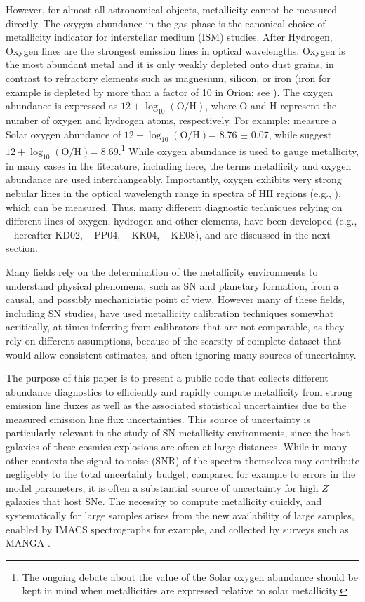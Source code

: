 \documentclass{emulateapj}
\newcommand{\oxabinline}{\ensuremath{12 + \log_{10}(\mathrm{O}/\mathrm{H})}}
\begin{document}
However, for almost all astronomical objects, metallicity cannot be
measured directly. The oxygen abundance in the gas-phase is the
canonical choice of metallicity indicator for interstellar medium
(ISM) studies. After Hydrogen, Oxygen lines are the strongest emission
lines in optical wavelengths. Oxygen is the most abundant metal and it
is only weakly depleted onto dust grains, in contrast to refractory
elements such as magnesium, silicon, or iron (iron for example is
depleted by more than a factor of 10 in Orion; see
\citealt{simondiaz11-orion}). The oxygen abundance is expressed as
\oxabinline, where O and H represent the number of oxygen and hydrogen
atoms, respectively. For example: \citealt{chaffau11} measure a Solar
oxygen abundance of \oxabinline = 8.76 $\pm$ 0.07, while
\citet{asplund09rev} suggest \oxabinline = 8.69.\footnote{The ongoing
  debate about the value of the Solar oxygen abundance should be kept
  in mind when metallicities are expressed relative to solar
  metallicity.}  While oxygen abundance is used to gauge metallicity,
in many cases in the literature, including here, the terms metallicity
and oxygen abundance are used interchangeably.  Importantly, oxygen
exhibits very strong nebular lines in the optical wavelength range in
spectra of HII regions (e.g.,
\citealt{pagel79,osterbrock89,tremonti04}), which can be
measured. Thus, many different diagnostic techniques relying on
different lines of oxygen, hydrogen and other elements, have been
developed (e.g., \citealt{kewley02} -- hereafter KD02,
\citealt{pettini04} -- PP04, \citealt{kobulnicky04} -- KK04,
\citealt{kewley08} -- KE08), and are discussed in the next section.

Many fields rely on the determination of the metallicity environments
to understand physical phenomena, such as SN and planetary formation,
from a causal, and possibly mechanicistic point of view. However many
of these fields, including SN studies, have used metallicity
calibration techniques somewhat acritically, at times inferring from
calibrators that are not comparable, as they rely on different
assumptions, because of the scarsity of complete dataset that would
allow consistent estimates, and often ignoring many sources of
uncertainty.

The purpose of this paper is to present a public code that collects
different abundance diagnostics to efficiently and rapidly compute
metallicity from strong emission line fluxes as well as the associated
statistical uncertainties due to the measured emission line flux
uncertainties. This source of uncertainty is particularly relevant in
the study of SN metallicity environments, since the host galaxies of
these cosmics explosions are often at large distances. While in many
other contexts the signal-to-noise (SNR) of the spectra themselves may
contribute negligebly to the total uncertainty budget, compared for
example to errors in the model parameters, it is often a substantial
source of uncertainty for high $Z$ galaxies that host SNe.  The
necessity to compute metallicity quickly, and systematically for large
samples arises from the new availability of large samples, enabled by
IMACS spectrographs for example, and collected by surveys such as
MANGA \citep{Bundy15}.
\end{document}
